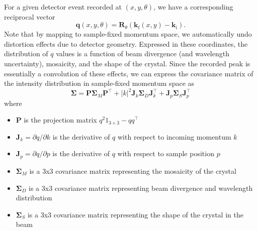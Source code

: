 \documentclass[11pt,a4paper]{article}
\def\v#1{\bm{{#1}}}
\def\tr{^\intercal}
\def\si{\text{i}}
\def\sf{\text{f}}
\def\k{{\v{k}}}
\def\q{{\v{q}}}
\begin{document}
For a given detector event recorded at $(x,y,\theta)$, we have a corresponding reciprocal vector
\begin{equation} \q(x, y, \theta) = \v{R}_\theta (\k_\sf(x, y) - \k_\si). \end{equation}
Note that by mapping to sample-fixed momentum space, we automatically undo distortion effects
due to detector geometry. Expressed in these coordinates, the distribution of $q$ values is a
function of beam divergence (and wavelength uncertainty), mosaicity, and the shape of the crystal.
Since the recorded peak is essentially a convolution of these effects, we can express the covariance
matrix of the intensity distribution in sample-fixed momentum space as
\begin{equation}
  \v\Sigma = \v{P} \v\Sigma_M \v{P}\tr + |k|^2 \v{J}_k \v\Sigma_D \v{J}_k\tr + \v{J}_p \v\Sigma_S \v{J}_p\tr
\end{equation}
where
\begin{itemize}
  \item $\v{P}$ is the projection matrix $q^2 1_{3\times 3}-qq\tr$
  \item $\v{J}_k = \partial q / \partial k$ is the derivative of $q$ with respect to incoming momentum $k$
  \item $\v{J}_p = \partial q / \partial p$ is the derivative of $q$ with respect to sample position $p$
  \item $\v\Sigma_M$ is a 3x3 covariance matrix representing the mosaicity of the crystal
  \item $\v\Sigma_D$ is a 3x3 covariance matrix representing beam divergence and wavelength distribution
  \item $\v\Sigma_S$ is a 3x3 covariance matrix representing the shape of the crystal in the beam
\end{itemize}
\end{document}

